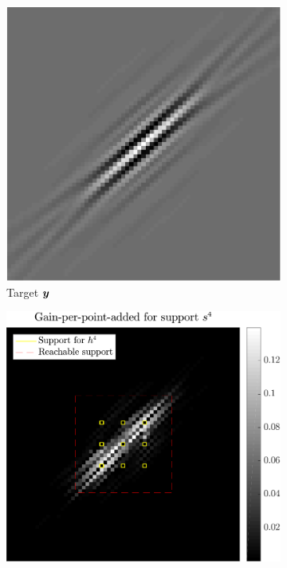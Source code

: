 \begin{figure}[!ht]\centering
	\begin{subfigure}[b]{0.30\textwidth}\centering
	\includegraphics[width=\linewidth]{figures/xp/n4/xp_128x128_sc2_angl1_K3_S3_node4_target.pdf}
	\caption{Target $\bm{y}$} \label{fig_gain_n4-target}
	\end{subfigure}
	\begin{subfigure}[b]{0.34\linewidth}\centering
	\includegraphics[width=\linewidth]{figures/xp/n4/xp_128x128_sc2_angl1_K3_S3_node4_objmatrix.pdf}

\end{subfigure}
\end{figure}
